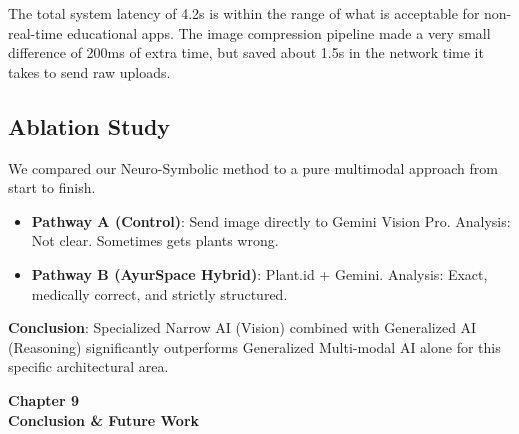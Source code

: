 \documentclass[12pt, a4paper]{report}
\begin{document}
The total system latency of 4.2s is within the range of what is acceptable for non-real-time educational apps. The image compression pipeline made a very small difference of 200ms of extra time, but saved about 1.5s in the network time it takes to send raw uploads.

\section{Ablation Study}
We compared our Neuro-Symbolic method to a pure multimodal approach from start to finish.
\begin{itemize}
    \item \textbf{Pathway A (Control)}: Send image directly to Gemini Vision Pro. Analysis: Not clear. Sometimes gets plants wrong.
    \item \textbf{Pathway B (AyurSpace Hybrid)}: Plant.id + Gemini. Analysis: Exact, medically correct, and strictly structured.
\end{itemize}
\textbf{Conclusion}: Specialized Narrow AI (Vision) combined with Generalized AI (Reasoning) significantly outperforms Generalized Multi-modal AI alone for this specific architectural area.

\newpage
\vspace*{\fill}
\begin{center}
\textbf{\Huge{Chapter 9}}\\
\vspace{5mm}
\textbf{\Huge{Conclusion \& Future Work}}
\end{center}
\vspace*{\fill}
\newpage
\titleformat{\chapter}[block]{\normalfont}{}{0pt}{}
\titlespacing{\chapter}{0pt}{-2em}{0pt}
\chapter[Conclusion and Future Work]{}
\titleformat{\chapter}[display]{\vspace{1cm}\normalfont\Large\bfseries\centering}{\chaptertitlename\ \thechapter}{20pt}{\vspace{0pt}}
\titlespacing*{\chapter}{0pt}{-50pt}{20pt}
\end{document}
